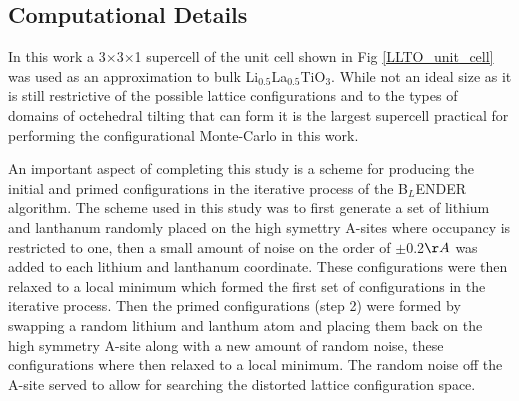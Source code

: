 \documentclass[aps,prl,reprint,superscriptaddress,showkeys]{revtex4-1}
\begin{document}
\subsection{Computational Details}
In this work a 3$\times$3$\times$1 supercell of the unit cell shown in Fig \ref{LLTO_unit_cell} was used as an approximation to bulk Li$_{0.5}$La$_{0.5}$TiO$_{3}$. While not an ideal size as it is still restrictive of the possible lattice configurations and to the types of domains of octehedral tilting that can form it is the largest supercell practical for performing the configurational Monte-Carlo in this work. 

An important aspect of completing this study is a scheme for producing the initial and primed configurations in the iterative process of the B$_L$ENDER algorithm. The scheme used in this study was to first generate a set of lithium and lanthanum randomly placed on the high symettry A-sites where occupancy is restricted to one, then a small amount of noise on the order of $\pm$0.2$\AA$ was added to each lithium and lanthanum coordinate. These configurations were then relaxed to a local minimum which formed the first set of configurations in the iterative process.  Then the primed configurations (step 2) were formed by swapping a random lithium and lanthum atom and placing them back on the high symmetry A-site along with a new amount of random noise, these configurations where then relaxed to a local minimum. The random noise off the A-site served to allow for searching the distorted lattice configuration space. 
\end{document}

